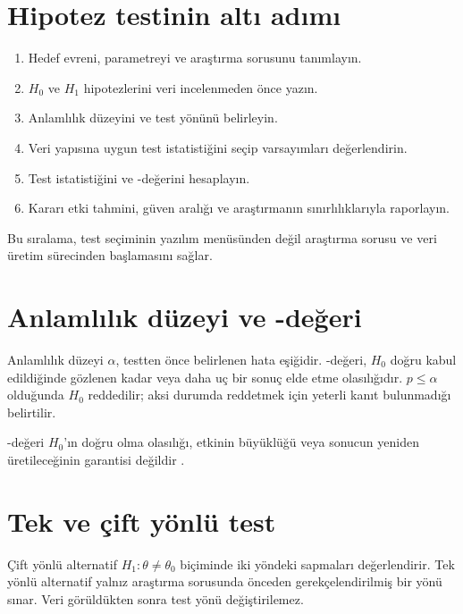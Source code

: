 \section{Hipotez testinin altı adımı}

\begin{enumerate}
  \item Hedef evreni, parametreyi ve araştırma sorusunu tanımlayın.
  \item $H_0$ ve $H_1$ hipotezlerini veri incelenmeden önce yazın.
  \item Anlamlılık düzeyini ve test yönünü belirleyin.
  \item Veri yapısına uygun test istatistiğini seçip varsayımları değerlendirin.
  \item Test istatistiğini ve \pval-değerini hesaplayın.
  \item Kararı etki tahmini, güven aralığı ve araştırmanın sınırlılıklarıyla raporlayın.
\end{enumerate}

Bu sıralama, test seçiminin yazılım menüsünden değil araştırma sorusu ve veri
üretim sürecinden başlamasını sağlar.

\section{Anlamlılık düzeyi ve \pval-değeri}
\label{sec:pvalue}

\begin{definitionbox}
Anlamlılık düzeyi $\alpha$, testten önce belirlenen hata eşiğidir. \pval-değeri,
$H_0$ doğru kabul edildiğinde gözlenen kadar veya daha uç bir sonuç elde etme
olasılığıdır. $p\leq\alpha$ olduğunda $H_0$ reddedilir; aksi durumda
reddetmek için yeterli kanıt bulunmadığı belirtilir.
\end{definitionbox}

\begin{mistakebox}
\pval-değeri $H_0$'ın doğru olma olasılığı, etkinin büyüklüğü veya sonucun yeniden
üretileceğinin garantisi değildir \citep{wasserstein2016}.
\end{mistakebox}

\section{Tek ve çift yönlü test}
\label{sec:test-direction}

Çift yönlü alternatif $H_1:\theta\neq\theta_0$ biçiminde iki yöndeki
sapmaları değerlendirir. Tek yönlü alternatif yalnız araştırma sorusunda
önceden gerekçelendirilmiş bir yönü sınar. Veri görüldükten sonra test yönü
değiştirilemez.

